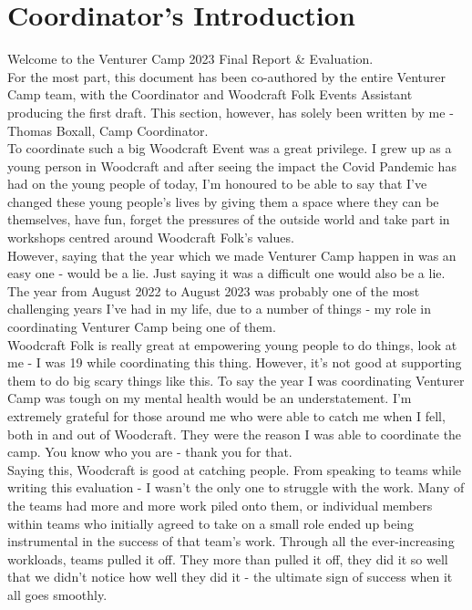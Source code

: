 \chapter{Coordinator's Introduction}

Welcome to the Venturer Camp 2023 Final Report \& Evaluation.\\

For the most part, this document has been co-authored by the entire Venturer Camp team, with the Coordinator and Woodcraft Folk Events Assistant producing the first draft. This section, however, has solely been written by me - Thomas Boxall, Camp Coordinator.\\

To coordinate such a big Woodcraft Event was a great privilege. I grew up as a young person in Woodcraft and after seeing the impact the Covid Pandemic has had on the young people of today, I'm honoured to be able to say that I've changed these young people's lives by giving them a space where they can be themselves, have fun, forget the pressures of the outside world and take part in workshops centred around Woodcraft Folk's values.\\

However, saying that the year which we made Venturer Camp happen in was an easy one - would be a lie. Just saying it was a difficult one would also be a lie. The year from August 2022 to August 2023 was probably one of the most challenging years I've had in my life, due to a number of things - my role in coordinating Venturer Camp being one of them. \\

Woodcraft Folk is really great at empowering young people to do things, look at me - I was 19 while coordinating this thing. However, it's not good at supporting them to do big scary things like this. To say the year I was coordinating Venturer Camp was tough on my mental health would be an understatement. I'm extremely grateful for those around me who were able to catch me when I fell, both in and out of Woodcraft. They were the reason I was able to coordinate the camp. You know who you are - thank you for that.\\

Saying this, Woodcraft is good at catching people. From speaking to teams while writing this evaluation - I wasn't the only one to struggle with the work. Many of the teams had more and more work piled onto them, or individual members within teams who initially agreed to take on a small role ended up being instrumental in the success of that team's work. Through all the ever-increasing workloads, teams pulled it off. They more than pulled it off, they did it so well that we didn't notice how well they did it - the ultimate sign of success when it all goes smoothly.\\

